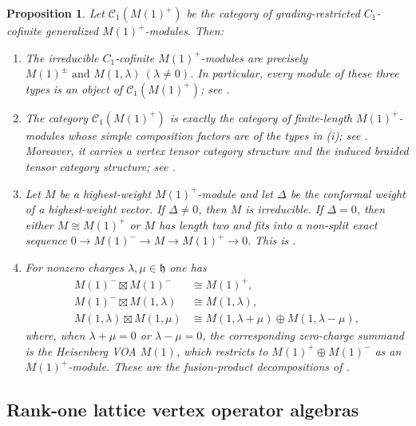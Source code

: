 \documentclass[10pt,a4paper]{amsart}
\numberwithin{equation}{section} \newtheorem{thm}{Theorem}[section] \newtheorem{lem}[thm]{Lemma} \newtheorem{ex}[thm]{Example} \newtheorem{prop}[thm]{Proposition} \newtheorem{cor}[thm]{Corollary} \newtheorem{defi}[thm]{Definition} \newtheorem{rmk}[thm]{Remark} \newtheorem{notation}[thm]{Notation}
\begin{document}
\begin{prop}\label{prop:ALY-package}
Let $\mathcal C_1(M(1)^+)$ be the category of grading-restricted $C_1$-cofinite generalized $M(1)^+$-modules. Then:
\begin{enumerate}[label=\textnormal{(\roman*)}]
\item The irreducible $C_1$-cofinite $M(1)^+$-modules are precisely
\(M(1)^\pm\text{ and }M(1,\lambda)\ (\lambda\ne0)\). In particular, every module of these three types is an object of $\mathcal C_1(M(1)^+)$; see \cite[Corollary~3.4 and Theorems~3.5--3.6]{ALY}.

\item The category $\mathcal C_1(M(1)^+)$ is exactly the category of
finite-length $M(1)^+$-modules whose simple composition factors are of the types in \textnormal{(i)}; see \cite[Theorem~4.2]{ALY}. Moreover, it carries a vertex tensor category structure and the induced braided tensor category structure; see \cite[Theorem~4.3]{ALY}.

\item Let $M$ be a highest-weight $M(1)^+$-module and let $\Delta$ be
the conformal weight of a highest-weight vector. If $\Delta\ne0$, then $M$ is irreducible. If $\Delta=0$, then either $M\cong M(1)^+$ or $M$ has length two and fits into a non-split exact sequence \(0\longrightarrow M(1)^-\longrightarrow M\longrightarrow M(1)^+\longrightarrow0.\) This is \cite[Theorem~3.8]{ALY}.

\item For nonzero charges $\lambda,\mu\in\mathfrak h$ one has
\begin{align*}
M(1)^-\boxtimes M(1)^-&\cong M(1)^+,\\
M(1)^-\boxtimes M(1,\lambda)&\cong M(1,\lambda),\\
M(1,\lambda)\boxtimes M(1,\mu)
&\cong M(1,\lambda+\mu)\oplus M(1,\lambda-\mu),
\end{align*}
where, when $\lambda+\mu=0$ or $\lambda-\mu=0$, the corresponding zero-charge summand is the Heisenberg VOA $M(1)$, which restricts to $M(1)^+\oplus M(1)^-$ as an $M(1)^+$-module. These are the fusion-product decompositions of \cite[Theorem~4.6]{ALY}.
\end{enumerate}
\end{prop}

\subsection{Rank-one lattice vertex operator algebras}
\label{subsec:rank-one-lattice}
\end{document}
